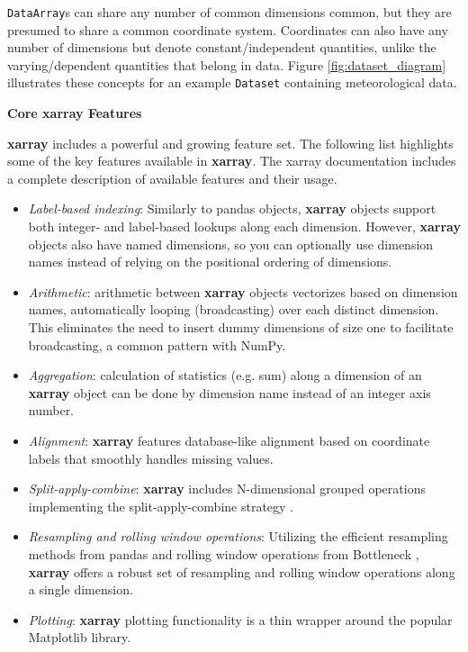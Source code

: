 \documentclass{jors}
\begin{document}
\verb|DataArray|s can share any number of common dimensions common, but they are presumed to share a common coordinate system.
Coordinates can also have any number of dimensions but denote constant/independent quantities, unlike the varying/dependent quantities that belong in data.
Figure \ref{fig:dataset_diagram} illustrates these concepts for an example \verb|Dataset| containing meteorological data.

\textbf{Core xarray Features}

\textbf{xarray} includes a powerful and growing feature set.
The following list highlights some of the key features available in \textbf{xarray}.
The xarray documentation \citep{xarray_docs} includes a complete description of available features and their usage.

\begin{itemize}
	\item \textit{Label-based indexing}: Similarly to pandas objects, \textbf{xarray} objects support both integer- and label-based lookups along each dimension.
	However, \textbf{xarray} objects also have named dimensions, so you can optionally use dimension names instead of relying on the positional ordering of dimensions.
	\item \textit{Arithmetic}: arithmetic between \textbf{xarray} objects vectorizes based on dimension names, automatically looping (broadcasting) over each distinct dimension. This eliminates the need to insert dummy dimensions of size one to facilitate broadcasting, a common pattern with NumPy.
	\item \textit{Aggregation}: calculation of statistics (e.g. sum) along a dimension of an \textbf{xarray} object can be done by dimension name instead of an integer axis number.
	\item \textit{Alignment}: \textbf{xarray} features database-like alignment based on coordinate labels that smoothly handles missing values.
	\item \textit{Split-apply-combine}: \textbf{xarray} includes N-dimensional grouped operations implementing the split-apply-combine strategy \citep{wickham_2011}.
	\item \textit{Resampling and rolling window operations}: Utilizing the efficient resampling methods from pandas and rolling window operations from Bottleneck \citep{Bottleneck}, \textbf{xarray} offers a robust set of resampling and rolling window operations along a single dimension.
	\item \textit{Plotting}: \textbf{xarray} plotting functionality is a thin wrapper around the popular Matplotlib library.

\end{itemize}
\end{document}
